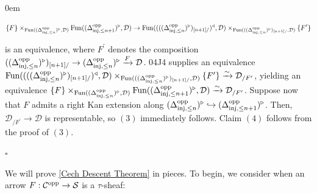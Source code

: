 \documentclass[10pt]{article}
\newcommand{\mS}{\mathcal S}
\newcommand{\C}{\mathcal C}
\newcommand{\cD}{\mathcal{D}}
\renewcommand{\qed}{\hfill$\square$}
\renewenvironment{proof}{\begin{addmargin}[1em]{0em}\begin{newproof}}{\end{newproof}\end{addmargin}\qed}
\theoremstyle{witharg}
\theoremstyle{witharg}
\theoremstyle{witharg2}
\begin{document}
\begin{proof}
    $$\{F\}\times_{\textnormal{Fun}((\Delta^{\textnormal{opp}}_{\textnormal{inj},\leq n})^\triangleright,\cD)}\textnormal{Fun}((\Delta^{\textnormal{opp}}_{\textnormal{inj},\leq n+1})^\triangleright,\cD)\rightarrow \textnormal{Fun}((((\Delta^{\textnormal{opp}}_{\textnormal{inj},\leq n})^\triangleright)_{[n+1]/})^\triangleleft,\cD)\times_{\textnormal{Fun}(((\Delta^{\textnormal{opp}}_{\textnormal{inj},\leq n})^\triangleright)_{[n+1]/},\cD)}\{F^\prime\}$$

    \noindent is an equivalence, where $F^\prime$ denotes the composition $((\Delta^{\textnormal{opp}}_{\textnormal{inj},\leq n})^\triangleright)_{[n+1]/}\rightarrow (\Delta^{\textnormal{opp}}_{\textnormal{inj},\leq n})^\triangleright\xrightarrow{F}\cD$.  04J4 supplies an equivalence $\textnormal{Fun}((((\Delta^{\textnormal{opp}}_{\textnormal{inj},\leq n})^\triangleright)_{[n+1]/})^\triangleleft,\cD)\times_{\textnormal{Fun}(((\Delta^{\textnormal{opp}}_{\textnormal{inj},\leq n})^\triangleright)_{[n+1]/},\cD)}\{F^\prime\}\xrightarrow{\sim}\cD_{/F^\prime}$, yielding an equivalence $\{F\}\times_{\textnormal{Fun}((\Delta^{\textnormal{opp}}_{\textnormal{inj},\leq n})^\triangleright,\cD)}\textnormal{Fun}((\Delta^{\textnormal{opp}}_{\textnormal{inj},\leq n+1})^\triangleright,\cD)\xrightarrow{\sim}\cD_{/F^\prime}$. Suppose now that $F$ admits a right Kan extension along $(\Delta^{\textnormal{opp}}_{\textnormal{inj},\leq n})^\triangleright\hookrightarrow (\Delta^{\textnormal{opp}}_{\textnormal{inj},\leq n+1})^\triangleright$. Then, $\cD_{/F^\prime}\rightarrow \cD$ is representable, so $(3)$ immediately follows. Claim $(4)$ follows from the proof of $(3)$.


    
\end{proof}

\noindent We will prove \ref{Cech Descent Theorem} in pieces. To begin, we consider when an arrow $F:\C^{\textnormal{opp}}\rightarrow \mS$ is a $\tau$-sheaf:
\end{document}
